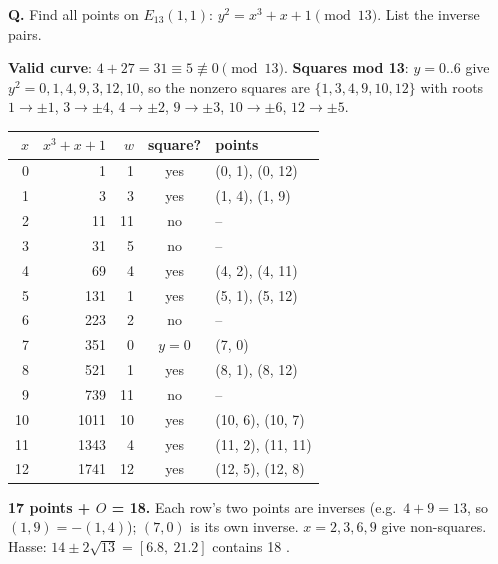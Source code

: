 \begin{worked}
\textbf{Q.} Find all points on $E_{13}(1, 1)$: $y^2 = x^3 + x + 1 \pmod{13}$. List the inverse pairs.

\textbf{Valid curve}: $4 + 27 = 31 \equiv 5 \not\equiv 0 \pmod{13}$. \textbf{Squares mod 13}: $y = 0..6$ give $y^2 = 0, 1, 4, 9, 3, 12, 10$, so the nonzero squares are $\{1, 3, 4, 9, 10, 12\}$ with roots $1 \to \pm1$, $3 \to \pm4$, $4 \to \pm2$, $9 \to \pm3$, $10 \to \pm6$, $12 \to \pm5$.
\begin{center}\small
\begin{tabular}{@{}rrrcl@{}}
\toprule
$x$ & $x^3 + x + 1$ & $w$ & square? & points\\
\midrule
0 & 1 & 1 & yes & (0, 1), (0, 12)\\
1 & 3 & 3 & yes & (1, 4), (1, 9)\\
2 & 11 & 11 & no & --\\
3 & 31 & 5 & no & --\\
4 & 69 & 4 & yes & (4, 2), (4, 11)\\
5 & 131 & 1 & yes & (5, 1), (5, 12)\\
6 & 223 & 2 & no & --\\
7 & 351 & 0 & $y = 0$ & (7, 0)\\
8 & 521 & 1 & yes & (8, 1), (8, 12)\\
9 & 739 & 11 & no & --\\
10 & 1011 & 10 & yes & (10, 6), (10, 7)\\
11 & 1343 & 4 & yes & (11, 2), (11, 11)\\
12 & 1741 & 12 & yes & (12, 5), (12, 8)\\
\bottomrule
\end{tabular}
\end{center}
\textbf{17 points + $O$ = 18.} Each row's two points are inverses (e.g.\ $4 + 9 = 13$, so $(1, 9) = -(1, 4)$); $(7, 0)$ is its own inverse. $x = 2, 3, 6, 9$ give non-squares. Hasse: $14 \pm 2\sqrt{13} = [6.8,\ 21.2]$ contains 18 \checkmark.
\end{worked}

